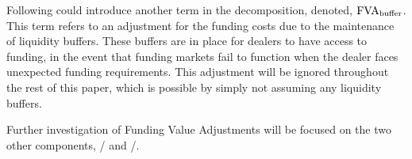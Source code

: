 \documentclass[main.tex]{subfiles}
\begin{document}
        Following \textcite{KPMGFVA} could introduce another term in the decomposition, denoted,
        $\FVA/_{\text{buffer}}$.
        This term refers to an adjustment for the funding costs
        due to the maintenance of liquidity buffers. 
        These buffers are in place for dealers to have access to funding, in the event
        that funding markets fail to function when the dealer faces unexpected funding requirements.
        This adjustment will be ignored throughout the rest of this paper, 
        which is possible by simply not assuming any liquidity buffers. 
        
        Further investigation of Funding Value Adjustments will be focused on the two other components,
        \FCA/ and \FBA/.
\end{document}
